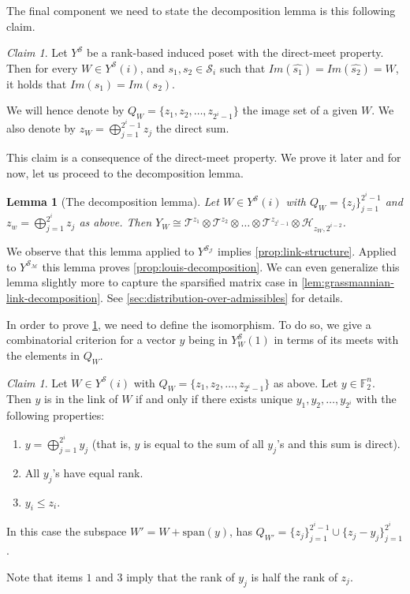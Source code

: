 \documentclass[10pt,a4paper]{article}
\newcommand{\prettyref}[1]{\cref{#1}}
\newtheorem{lemma}[theorem]{Lemma}
\theoremstyle{definition}
\theoremstyle{remark}
\newtheorem{claim}[theorem]{Claim}
\newcommand{\set}[1]{\{#1\}}
\def\sp{\mathrm{ span}}
\newcommand{\F}{\mathbb{F}}
\renewcommand{\leq}{\leqslant}
\numberwithin{equation}{section}
\let\pref=\prettyref
\def\Y{Y}
\def\MP{\mathcal{M}}
\begin{document}
The final component we need to state the decomposition lemma is this following claim.

\begin{claim} \label{claim:uniqueness-of-image-set-ranks}
    Let \(\Y^\mathcal{S}\) be a rank-based induced poset with the direct-meet property. Then for every \(W \in \Y^{\mathcal{S}}(i)\), and \(s_1,s_2 \in \mathcal{S}_i\) such that \(Im(\widehat{s_1})=Im(\widehat{s_2}) = W\), it holds that \(Im(s_1) = Im(s_2)\).
\end{claim}
We will hence denote by \(Q_W = \set{z_1,z_2,\dots,z_{2^i-1}}\) the image set of a given \(W\). We also denote by \(z_W = \bigoplus_{j=1}^{2^i-1}z_j\) the direct sum.

This claim is a consequence of the direct-meet property. We prove it later and for now, let us proceed to the decomposition lemma.

\begin{lemma}[The decomposition lemma]\label{lem:generalized-decomposition-lemma}
    Let \(W \in \Y^{\mathcal{S}}(i)\) with \(Q_W = \set{z_j}_{j=1}^{2^i - 1}\) and \(z_w = \bigoplus_{j=1}^{2^i} z_j\) as above. Then \(\Y_W \cong \mathcal{T}^{z_1} \otimes \mathcal{T}^{z_2} \otimes \dots \otimes \mathcal{T}^{z_{2^i-1}} \otimes \mathcal{H}_{z_W,2^{i-2}}\).
\end{lemma}

We observe that this lemma applied to \(\Y^{\mathcal{S}_{\mathcal{J}}}\) implies \pref{prop:link-structure}. Applied to \(\Y^{\mathcal{S}_{\MP}}\) this lemma proves \pref{prop:louis-decomposition}. We can even generalize this lemma slightly more to capture the sparsified matrix case in \pref{lem:grassmannian-link-decomposition}. See \pref{sec:distribution-over-admissibles} for details.

In order to prove \pref{lem:generalized-decomposition-lemma}, we need to define the isomorphism. To do so, we give a combinatorial criterion for a vector \(y\) being in \(\Y_W^{\mathcal{S}}(1)\) in terms of its meets with the elements in \(Q_W\). 

\begin{claim} \label{claim:abstract-unique-decomposition}
    Let \(W \in \Y^{\mathcal{S}}(i)\) with \(Q_W = \set{z_1,z_2,\dots,z_{2^i-1}}\) as above. Let \(y \in \F_2^n\). Then \(y\) is in the link of \(W\) if and only if there exists unique \(y_1,y_2,\dots,y_{2^i}\) with the following properties:
    \begin{enumerate}
        \item \(y = \bigoplus_{j=1}^{2^i} y_j\) (that is, \(y\) is equal to the sum of all \(y_j\)'s and this sum is direct).
        \item All \(y_j\)'s have equal rank.
        \item \(y_i \leq z_i\).
    \end{enumerate}
    In this case the subspace \(W' = W + \sp(y)\), has \(Q_{W'} = \set{z_j}_{j=1}^{2^i-1} \cup \set{z_j - y_j}_{j=1}^{2^i}\).
\end{claim}
Note that items \(1\) and \(3\) imply that the rank of \(y_j\) is half the rank of \(z_j\).
\end{document}
